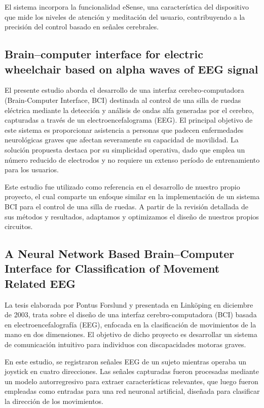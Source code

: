 \documentclass{article}
\begin{document}
El sistema incorpora la funcionalidad eSense, una característica del dispositivo que mide los niveles de atención y meditación del usuario, contribuyendo a la precisión del control basado en señales cerebrales.

\subsection{Brain–computer interface for electric wheelchair
based on alpha waves of EEG signal}

El presente estudio aborda el desarrollo de una interfaz cerebro-computadora (Brain-Computer Interface, BCI) destinada al control de una silla de ruedas eléctrica mediante la detección y análisis de ondas alfa generadas por el cerebro, capturadas a través de un electroencefalograma (EEG). El principal objetivo de este sistema es proporcionar asistencia a personas que padecen enfermedades neurológicas graves que afectan severamente su capacidad de movilidad. La solución propuesta destaca por su simplicidad operativa, dado que emplea un número reducido de electrodos y no requiere un extenso período de entrenamiento para los usuarios.

Este estudio fue utilizado como referencia en el desarrollo de nuestro propio proyecto, el cual comparte un enfoque similar en la implementación de un sistema BCI para el control de una silla de ruedas. A partir de la revisión detallada de sus métodos y resultados, adaptamos y optimizamos el diseño de nuestros propios circuitos.

\subsection{A Neural Network Based Brain–Computer Interface for Classification of Movement Related EEG}

La tesis elaborada por Pontus Forslund y presentada en Linköping en diciembre de 2003, trata sobre el diseño de una interfaz cerebro-computadora (BCI) basada en electroencefalografía (EEG), enfocada en la clasificación de movimientos de la mano en dos dimensiones. El objetivo de dicho proyecto es desarrollar un sistema de comunicación intuitivo para individuos con discapacidades motoras graves.

En este estudio, se registraron señales EEG de un sujeto mientras operaba un joystick en cuatro direcciones. Las señales capturadas fueron procesadas mediante un modelo autorregresivo para extraer características relevantes, que luego fueron empleadas como entradas para una red neuronal artificial, diseñada para clasificar la dirección de los movimientos.
\end{document}
